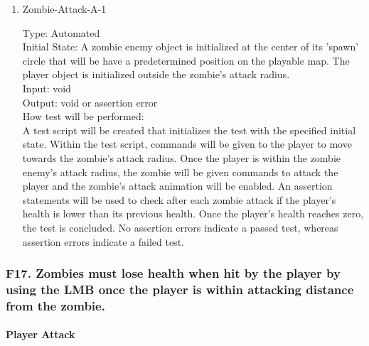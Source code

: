 \documentclass[12pt, titlepage]{article}
\newcounter{ftnum}
\begin{document}
\begin{enumerate}

\item{Zombie-Attack-A-1\\}  \label{F16-1}

Type: Automated \\
					
Initial State: A zombie enemy object is initialized at the center of its 'spawn' circle that will be have a predetermined position on the playable map. The player object is initialized outside the zombie's attack radius.\\
					
Input: void \\
					
Output: void or assertion error \\
					
How test will be performed:\\  A test script will be created that initializes the test with the specified initial state. Within the test script, commands will be given to the player to move towards the zombie's attack radius.  Once the player is within the zombie enemy's attack radius, the zombie will be given commands to attack the player and the zombie's attack animation will be enabled. An assertion statements will be used to check after each zombie attack if the player's health is lower than its previous health. Once the player's health reaches zero, the test is concluded. No assertion errors indicate a passed test, whereas assertion errors indicate a failed test.\\

\end{enumerate}

\subsubsection{{\color{magenta} F17.} Zombies must lose health when hit by the player {\color{magenta} by using the LMB once the player is within attacking distance from the zombie.}} 

\paragraph{Player Attack}
\end{document}
